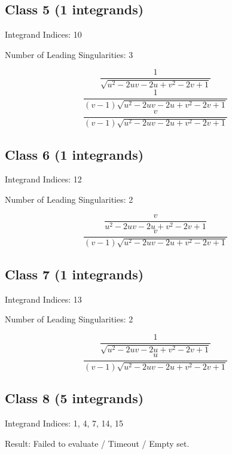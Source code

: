 \documentclass[11pt,a4paper]{article}
\begin{document}
\subsection*{Class 5 (1 integrands)}
Integrand Indices: 10

Number of Leading Singularities: 3

\begin{equation}
\frac{1}{\sqrt{u^2-2 u v-2 u+v^2-2 v+1}}
\end{equation}
\begin{equation}
\frac{1}{(v-1) \sqrt{u^2-2 u v-2 u+v^2-2 v+1}}
\end{equation}
\begin{equation}
\frac{v}{(v-1) \sqrt{u^2-2 u v-2 u+v^2-2 v+1}}
\end{equation}


\subsection*{Class 6 (1 integrands)}
Integrand Indices: 12

Number of Leading Singularities: 2

\begin{equation}
\frac{v}{u^2-2 u v-2 u+v^2-2 v+1}
\end{equation}
\begin{equation}
\frac{v}{(v-1) \sqrt{u^2-2 u v-2 u+v^2-2 v+1}}
\end{equation}


\subsection*{Class 7 (1 integrands)}
Integrand Indices: 13

Number of Leading Singularities: 2

\begin{equation}
\frac{1}{\sqrt{u^2-2 u v-2 u+v^2-2 v+1}}
\end{equation}
\begin{equation}
\frac{u}{(v-1) \sqrt{u^2-2 u v-2 u+v^2-2 v+1}}
\end{equation}


\subsection*{Class 8 (5 integrands)}
Integrand Indices: 1, 4, 7, 14, 15

Result: Failed to evaluate / Timeout / Empty set.\\[1em]
\end{document}
